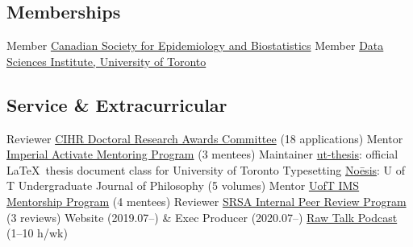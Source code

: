\subsection{Memberships}
  {Member}
  {\href{https://cseb.ca/}{Canadian Society for Epidemiology and Biostatistics}}
  {Member}
  {\href{https://datasciences.utoronto.ca/}{Data Sciences Institute, University of Toronto}}
\subsection{Service \& Extracurricular}
  {Reviewer}
  {\href{https://cihr-irsc.gc.ca/e/48273.html}{CIHR Doctoral Research Awards Committee} (18 applications)}
  {Mentor}
  {\href{https://www.imperial.ac.uk/students/academic-support/graduate-school/wellbeing-and-support/activate-student-mentoring-programme/}
        {Imperial Activate Mentoring Program} (3 mentees)}
  {Maintainer}
  {\href{https://www.ctan.org/pkg/ut-thesis}{ut-thesis}: official \LaTeX\ thesis document class for University of Toronto}
  {Typesetting} %
  {\href{https://www.noesisjournal.com}{No\={e}sis}: U of T Undergraduate Journal of Philosophy (5 volumes)}
  {Mentor} %
  {\href{https://ims.utoronto.ca/ims-p2p-mentorship}{UofT IMS Mentorship Program} (4 mentees)}
  {Reviewer} %
  {\href{https://research.unityhealth.to/future-students-trainees/st-michaels-hospital-research-student-association}
        {SRSA Internal Peer Review Program} (3 reviews)}
  {Website \textnormal{(2019.07--)} \& Exec Producer \textnormal{(2020.07--)}}
  {\href{https://www.rawtalkpodcast.com}{Raw Talk Podcast} (1--10 h/wk)}
